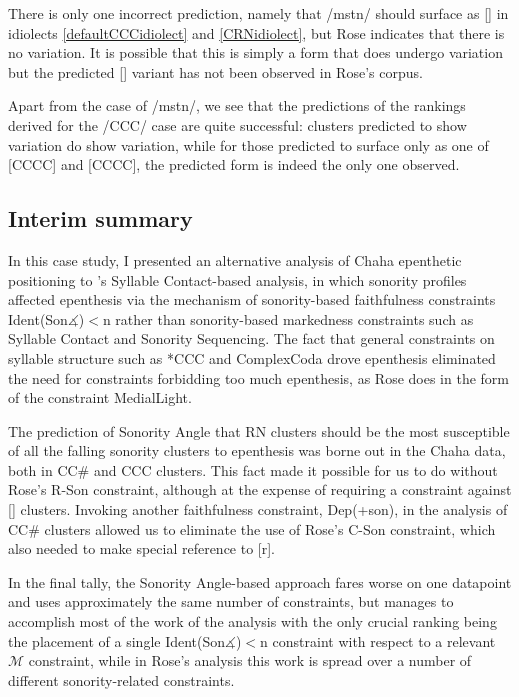 \documentclass[12pt]{article}
\begin{document}
There is only one incorrect prediction, namely that /mstn/ should surface as [] in idiolects \ref{defaultCCCidiolect} and \ref{CRNidiolect}, but Rose indicates that there is no variation. It is possible that this is simply a form that does undergo variation but the predicted [] variant has not been observed in Rose's corpus.

Apart from the case of /mstn/, we see that the predictions of the rankings derived for the /CCC/ case are quite successful: clusters predicted to show variation do show variation, while for those predicted to surface only as one of [CCCC] and [CCCC], the predicted form is indeed the only one observed.

\subsection{Interim summary}

In this case study, I presented an alternative analysis of Chaha epenthetic positioning to \citet{rose.2000}'s Syllable Contact-based analysis, in which sonority profiles affected epenthesis via the mechanism of sonority-based faithfulness constraints {\sc Ident(Son$\measuredangle$)}$<$n rather than sonority-based markedness constraints such as Syllable Contact and Sonority Sequencing. The fact that general constraints on syllable structure such as *CCC and {\sc *ComplexCoda} drove epenthesis eliminated the need for constraints forbidding too much epenthesis, as Rose does in the form of the constraint {\sc *MedialLight}.

The prediction of {\sc Sonority Angle} that RN clusters should be the most susceptible of all the falling sonority clusters to epenthesis was borne out in the Chaha data, both in CC\# and CCC clusters. This fact made it possible for us to do without Rose's {\sc *R-Son} constraint, although at the expense of requiring a constraint against [] clusters. Invoking another faithfulness constraint, {\sc Dep}(+son), in the analysis of CC\# clusters allowed us to eliminate the use of Rose's {\sc *C-Son} constraint, which also needed to make special reference to [r].


In the final tally, the {\sc Sonority Angle}-based approach fares worse on one datapoint and uses approximately the same number of constraints, but manages to accomplish most of the work of the analysis with the only crucial ranking being the placement of a single {\sc Ident(Son$\measuredangle$)}$<$n constraint with respect to a relevant $\mathcal{M}$ constraint, while in Rose's analysis this work is spread over a number of different sonority-related constraints.
\end{document}

